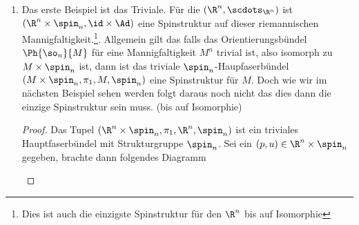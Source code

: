 \begin{Bsp}
  \begin{enumerate}[(1)]
  \item Das erste Beispiel ist das Triviale. Für die \RMF
    $(\R^n, \scdots_{\R^n})$ ist
    $(\R^n \times \spin_n,\id \times \Ad)$ eine Spinstruktur auf
    dieser riemannischen Mannigfaltigkeit.\footnote{Dies ist auch die
      einzigste Spinstruktur für den $ \R^n $ bis auf
      Isomorphie}. Allgemein gilt das falls das Orientierungsbündel
     $ \Ph{\so_n}{M} $ für eine Mannigfaltigkeit
    $ M^n $ trivial ist, also isomorph zu $ M\times \spin_n $ ist,
    dann ist das triviale $ \spin_n $-Haupfaserbündel
    $ (M\times \spin_n,\pi_1,M,\spin_n) $ eine Spinstruktur für $ M $.
    Doch wie wir im nächsten Beispiel sehen werden folgt daraus noch
    nicht das dies dann die einzige Spinstruktur sein muss. (bis auf
    Isomorphie)
    \begin{proof}
      Das Tupel $ (\R^n\times \spin_n,\pi_1,\R^n,\spin_n) $ ist ein
      triviales Hauptfaserbündel mit Strukturgruppe $ \spin_n $.  Sei
      ein $ (p,u)\in \R^n\times \spin_n $ gegeben, brachte dann
      folgendes Diagramm
			
      \begin{center}
					
      \end{center}

    \end{proof}
		

\end{enumerate}
\end{Bsp}
